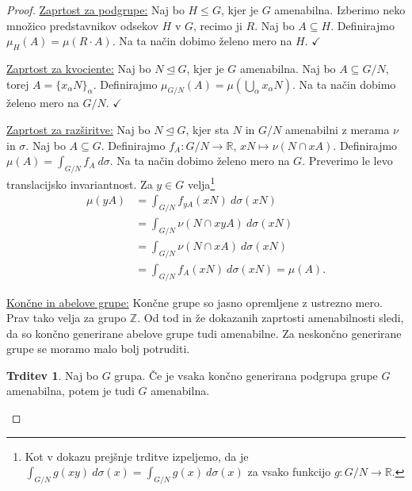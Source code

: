 \documentclass[11pt]{book}
\def\ZZ{\mathbb{Z}}
\def\RR{\mathbb{R}}
\def\kljuka{$\checkmark$}
\theoremstyle{definition}
\theoremstyle{zgled}
\theoremstyle{odprtproblem}
\theoremstyle{domacanaloga}
\newenvironment{dokaz}
    {\color{siva}\begin{proof}}
    {\end{proof}}
\theoremstyle{izrek}
\newtheorem*{trditev}{Trditev}
\begin{document}
\begin{dokaz}
\underline{Zaprtost za podgrupe:} Naj bo $H \leq G$, kjer je $G$ amenabilna. Izberimo neko množico predstavnikov odsekov $H$ v $G$, recimo ji $R$. Naj bo $A \subseteq H$. Definirajmo $\mu_H(A) = \mu(R \cdot A)$. Na ta način dobimo želeno mero na $H$. \kljuka

\underline{Zaprtost za kvociente:} Naj bo $N \unlhd G$, kjer je $G$ amenabilna. Naj bo $A \subseteq G/N$, torej $A = \{ x_{\alpha}N \}_{\alpha}$. Definirajmo $\mu_{G/N}(A) = \mu(\bigcup_{\alpha} x_\alpha N)$. Na ta način dobimo želeno mero na $G/N$. \kljuka

\underline{Zaprtost za razširitve:} Naj bo $N \unlhd G$, kjer sta $N$ in $G/N$ amenabilni z merama $\nu$ in $\sigma$. Naj bo $A \subseteq G$. Definirajmo $f_A \colon G/N \to \RR$, $xN \mapsto \nu(N \cap xA)$. Definirajmo $\mu(A) = \int_{G/N} f_A \ d \sigma$. Na ta način dobimo želeno mero na $G$. Preverimo le levo translacijsko invariantnost. Za $y \in G$ velja\footnote{Kot v dokazu prejšnje trditve izpeljemo, da je $\int_{G/N} g(xy) \ d \sigma(x) = \int_{G/N} g(x) \ d \sigma(x)$ za vsako funkcijo $g \colon G/N \to \RR$.}
\begin{align*}
\mu(yA) &= \int_{G/N} f_{yA}(xN) \ d \sigma(xN) \\
&= \int_{G/N} \nu(N \cap xyA) \ d \sigma(xN) \\
&= \int_{G/N} \nu(N \cap xA) \ d \sigma(xN) \\
&= \int_{G/N} f_A(xN) \ d \sigma(xN) = \mu(A).
\end{align*}

\underline{Končne in abelove grupe:} Končne grupe so jasno opremljene z ustrezno mero. Prav tako velja za grupo $\ZZ$. Od tod in že dokazanih zaprtosti amenabilnosti sledi, da so končno generirane abelove grupe tudi amenabilne. Za neskončno generirane grupe se moramo malo bolj potruditi.

\begin{trditev}
Naj bo $G$ grupa. Če je vsaka končno generirana podgrupa grupe $G$ amenabilna, potem je tudi $G$ amenabilna.
\end{trditev}


\end{dokaz}
\end{document}
